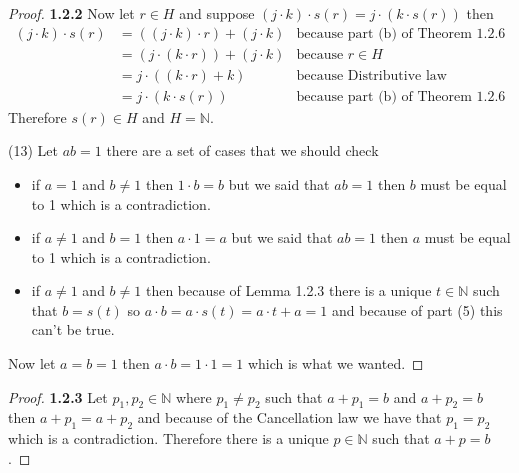 \documentclass[11pt]{article}
\newcommand{\N}{\mathbb{N}}
\theoremstyle{definition}
\begin{document}
\begin{proof}{\textbf{1.2.2}}
        Now let $r \in H$ and suppose $(j\cdot k)\cdot s(r) = j\cdot(k\cdot s(r))$
        then
        \begin{align*}
            (j \cdot k) \cdot s(r) &= ((j \cdot k) \cdot r ) + (j \cdot k) & \text{because part (b) of Theorem 1.2.6}\\
                &= (j \cdot (k \cdot r)) + (j \cdot k) & \text{because }r \in H \\
                &= j \cdot ((k\cdot r) + k) & \text{because Distributive law} \\
                &= j \cdot (k \cdot s(r)) & \text{because part (b) of Theorem 1.2.6}
        \end{align*}
        Therefore $s(r) \in H$ and $H = \N$.
        \item [(13)] Let $ab=1$ there are a set of cases that we should check
        \begin{itemize}
            \item if $a = 1$ and $b \neq 1$ then $1 \cdot b = b$ but we said
            that $ab = 1$ then $b$ must be equal to 1 which is a contradiction.
            \item if $a \neq 1$ and $b = 1$ then $a \cdot 1 = a$ but we said
            that $ab = 1$ then $a$ must be equal to 1 which is a contradiction.
            \item if $a \neq 1$ and $b \neq 1$ then because of Lemma 1.2.3
            there is a unique $t \in \N$ such that $b= s(t)$ so 
            $a \cdot b = a \cdot s(t) = a \cdot t + a = 1$ and because of part
            (5) this can't be true.
        \end{itemize}        
        Now let $a=b=1$ then $a\cdot b=1 \cdot 1 = 1$ which is what we wanted.
    \end{proof}
	\begin{proof}{\textbf{1.2.3}} Let $p_1, p_2 \in\N$ where $p_1 \neq p_2$
        such that $a +p_1 = b$ and $a + p_2 = b$ then $a + p_1 = a + p_2$ and
        because of the Cancellation law we have that $p_1 = p_2$ which is a
        contradiction. Therefore there is a unique $p \in \N$ such that
        $a + p = b$. 
    \end{proof}
\end{document}
